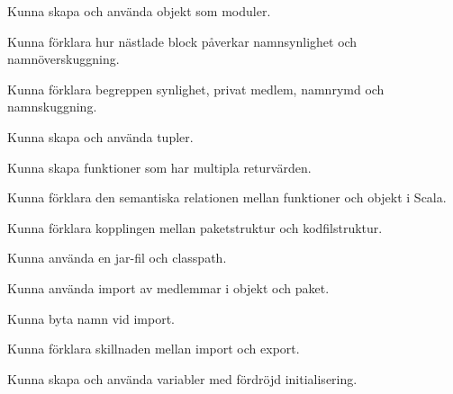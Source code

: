 
\item Kunna skapa och använda objekt som moduler.
\item Kunna förklara hur nästlade block påverkar namnsynlighet och namnöverskuggning.
\item Kunna förklara begreppen synlighet, privat medlem, namnrymd och namnskuggning.

\item Kunna skapa och använda tupler.
\item Kunna skapa funktioner som har multipla returvärden.
\item Kunna förklara den semantiska relationen mellan funktioner och objekt i Scala.

\item Kunna förklara kopplingen mellan paketstruktur och kodfilstruktur.
\item Kunna använda en jar-fil och classpath.

\item Kunna använda import av medlemmar i objekt och paket.
\item Kunna byta namn vid import.
\item Kunna förklara skillnaden mellan import och export.

\item Kunna skapa och använda variabler med fördröjd initialisering.
